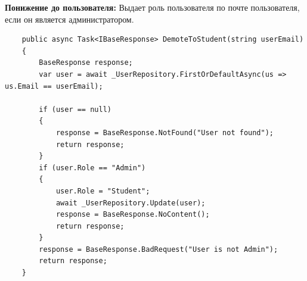\textbf{Понижение до пользователя:} Выдает роль пользователя по почте пользователя, если он является администратором.
\begin{verbatim}
    public async Task<IBaseResponse> DemoteToStudent(string userEmail)
    {
        BaseResponse response;
        var user = await _UserRepository.FirstOrDefaultAsync(us => us.Email == userEmail);

        if (user == null)
        {
            response = BaseResponse.NotFound("User not found");
            return response;
        }
        if (user.Role == "Admin")
        {
            user.Role = "Student";
            await _UserRepository.Update(user);
            response = BaseResponse.NoContent();
            return response;
        }
        response = BaseResponse.BadRequest("User is not Admin");
        return response;
    }
\end{verbatim}
